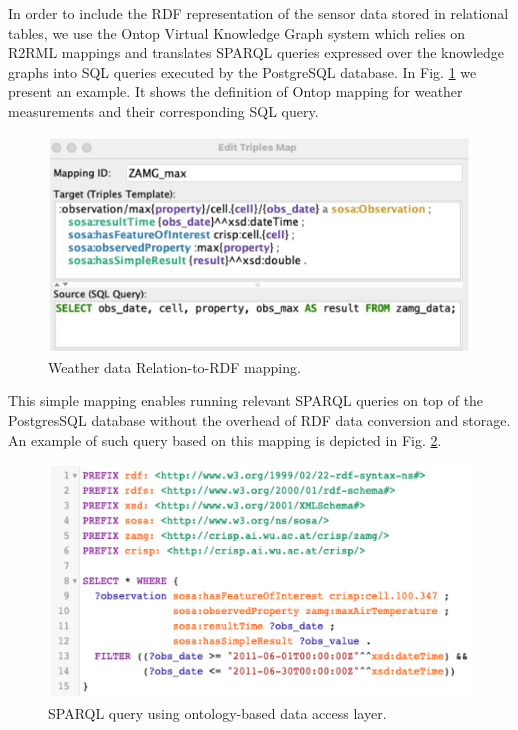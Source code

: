 \documentclass[
]{ceurart}
\begin{document}
In order to include the RDF representation of the sensor data stored in relational tables, we use the Ontop Virtual Knowledge Graph system \cite{xiao2020virtual} which relies on R2RML mappings and translates SPARQL queries expressed over the knowledge graphs into SQL queries executed by the PostgreSQL database. In Fig. \ref{zamg_mapping} we present an example. It shows the definition of Ontop mapping for weather measurements and their corresponding SQL query. 


\begin{figure}
  \centering
  \includegraphics[scale=0.35]{images/ZAMG_mapping_obda.png}
  \caption{Weather data Relation-to-RDF mapping.}
  \label{zamg_mapping}
\end{figure}


This simple mapping enables running relevant SPARQL queries on top of the PostgresSQL database without the overhead of RDF data conversion and storage. An example of such query based on this mapping is depicted in Fig. \ref{zamg_sparql}.  

\begin{figure}
  \centering
  \includegraphics[scale=0.35]{images/ZAMG_mapping_sparql.png}
  \caption{SPARQL query using ontology-based data access layer.}
  \label{zamg_sparql}
\end{figure}
\end{document}
